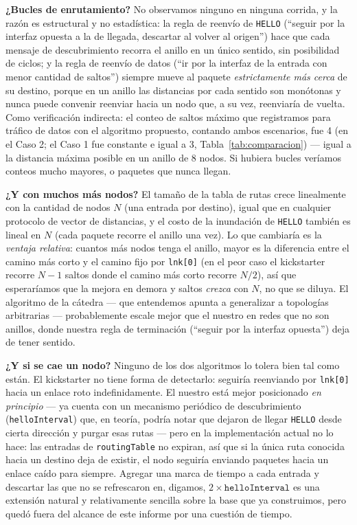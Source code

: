 \documentclass[10pt,letterpaper,twocolumn]{article}
\begin{document}
\textbf{¿Bucles de enrutamiento?} No observamos ninguno en ninguna corrida, y
la razón es estructural y no estadística: la regla de reenvío de
\texttt{HELLO} (``seguir por la interfaz opuesta a la de llegada, descartar al
volver al origen'') hace que cada mensaje de descubrimiento recorra el anillo
en un único sentido, sin posibilidad de ciclos; y la regla de reenvío de datos
(``ir por la interfaz de la entrada con menor cantidad de saltos'') siempre
mueve al paquete \emph{estrictamente más cerca} de su destino, porque en un
anillo las distancias por cada sentido son monótonas y nunca puede convenir
reenviar hacia un nodo que, a su vez, reenviaría de vuelta. Como verificación
indirecta: el conteo de saltos máximo que registramos para tráfico de datos con
el algoritmo propuesto, contando ambos escenarios, fue 4 (en el Caso 2; el
Caso 1 fue constante e igual a 3, Tabla~\ref{tab:comparacion}) --- igual a la
distancia máxima posible en un anillo de 8 nodos. Si hubiera bucles veríamos
conteos mucho mayores, o paquetes que nunca llegan.

\textbf{¿Y con muchos más nodos?} El tamaño de la tabla de rutas crece
linealmente con la cantidad de nodos $N$ (una entrada por destino), igual que
en cualquier protocolo de vector de distancias, y el costo de la inundación de
\texttt{HELLO} también es lineal en $N$ (cada paquete recorre el anillo una
vez). Lo que cambiaría es la \emph{ventaja relativa}: cuantos más nodos tenga
el anillo, mayor es la diferencia entre el camino más corto y el camino fijo
por \texttt{lnk[0]} (en el peor caso el kickstarter recorre $N-1$ saltos donde
el camino más corto recorre $N/2$), así que esperaríamos que la mejora en
demora y saltos \emph{crezca} con $N$, no que se diluya. El algoritmo de la
cátedra --- que entendemos apunta a generalizar a topologías arbitrarias ---
probablemente escale mejor que el nuestro en redes que no son anillos, donde
nuestra regla de terminación (``seguir por la interfaz opuesta'') deja de tener
sentido.

\textbf{¿Y si se cae un nodo?} Ninguno de los dos algoritmos lo tolera bien tal
como están. El kickstarter no tiene forma de detectarlo: seguiría reenviando
por \texttt{lnk[0]} hacia un enlace roto indefinidamente. El nuestro está
mejor posicionado \emph{en principio} --- ya cuenta con un mecanismo periódico
de descubrimiento (\texttt{helloInterval}) que, en teoría, podría notar que
dejaron de llegar \texttt{HELLO} desde cierta dirección y purgar esas rutas ---
pero en la implementación actual no lo hace: las entradas de
\texttt{routingTable} no expiran, así que si la única ruta conocida hacia un
destino deja de existir, el nodo seguiría enviando paquetes hacia un enlace
caído para siempre. Agregar una marca de tiempo a cada entrada y descartar las
que no se refrescaron en, digamos, $2\times\texttt{helloInterval}$ es una
extensión natural y relativamente sencilla sobre la base que ya construimos,
pero quedó fuera del alcance de este informe por una cuestión de tiempo.
\end{document}

